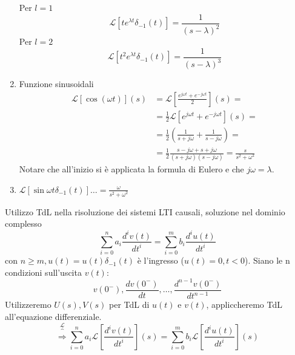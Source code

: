 \documentclass[a4paper, 12pt]{book}
\theoremstyle{plain}
\begin{document}
\begin{enumerate}
\[    \] 
    Per $l = 1$ \[ \mathcal{L} [t e^{\lambda t} \delta_{-1}(t)] = \frac{1}{(s - \lambda)^2} \] 
    Per $l = 2$ \[ \mathcal{L} [t^2 e^{\lambda t} \delta_{-1}(t)] = \frac{1}{(s - \lambda)^3} \]
    \item Funzione sinusoidali 
    \[ 
        \begin{split}
            \mathcal{L}[\cos(\omega t)] (s) &=  \mathcal{L} [\frac{e^{j \omega t} + e^{-j \omega t}}{2}] (s) = \\
            &= \frac{1}{2} \mathcal{L} [e^{j\omega t} + e^{-j \omega t}] (s) = \\
            &= \frac{1}{2} (\frac{1}{s + j \omega} + \frac{1}{s - j \omega}) = \\
            &= \frac{1}{2} \frac{s - j\omega + s + j\omega}{(s+j\omega)(s - j\omega)} = \frac{s}{s^2 + \omega^2}
        \end{split}
    \] 
    Notare che all'inizio si è applicata la formula di Eulero e che $j\omega = \lambda$.
    \item $\mathcal{L} [\sin \omega t \delta_{-1} (t)] \dots = \frac{\omega}{s^2 + \omega^2}$
\end{enumerate}
Utilizzo TdL nella risoluzione dei sistemi LTI causali, 
soluzione nel dominio complesso 
\[ 
    \sum_{i = 0}^n a_i \frac{d^i v(t)}{dt^i} = \sum_{i = 0}^m b_i \frac{d^i u(t)}{dt^i}
\]
con $n \ge m, u(t) = u(t) \delta_{-1} (t) $ è l'ingresso 
($u(t) = 0, t < 0$). Siano le n condizioni sull'uscita $v(t)$:
\[
    v(0^-), \frac{dv(0^-)}{dt}, \dots, \frac{d^{n - 1}v(0^-)}{dt^{n - 1}}
\]
Utilizzeremo $U(s), V(s)$ per TdL di $u(t)$ e $v(t)$, 
appliccheremo TdL all'equazione differenziale.
\[
    \overbrace{\Rightarrow}^{\mathcal{L}} \sum_{i= 0}^n 
    a_i \mathcal{L} [ \frac{d^iv(t)}{dt^i}](s) = \sum_{i= 0}^m 
    b_i \mathcal{L} [\frac{d^i u(t)}{dt^i}](s)
\]
\end{document}
